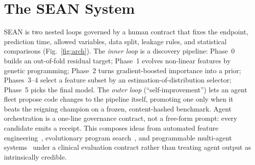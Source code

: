 \documentclass[10pt,conference]{IEEEtran}
\newcommand{\sean}{SEAN}
\begin{document}
\section{The \sean{} System}\label{sec:system}
\sean{} is two nested loops governed by a human contract that fixes the endpoint, prediction
time, allowed variables, data split, leakage rules, and statistical comparisons
(Fig.~\ref{fig:arch}). The \emph{inner loop} is a discovery pipeline: Phase~0 builds an
out-of-fold residual target; Phase~1 evolves non-linear features by genetic programming;
Phase~2 turns gradient-boosted importance into a prior; Phases~3--4 select a feature subset by
an estimation-of-distribution selector; Phase~5 picks the final model. The \emph{outer loop}
(``self-improvement'') lets an agent fleet propose code changes to the pipeline itself,
promoting one only when it beats the reigning champion on a frozen, content-hashed benchmark.
Agent orchestration is a one-line governance contract, not a free-form prompt: every candidate
emits a receipt. This composes ideas from automated feature
engineering~\cite{openfe2022,autofeat2019}, evolutionary program
search~\cite{koza1992,real2020}, and programmable multi-agent
systems~\cite{autogen2023,evoagent2024,dspy2023} under a clinical evaluation contract rather
than treating agent output as intrinsically credible.
\end{document}

